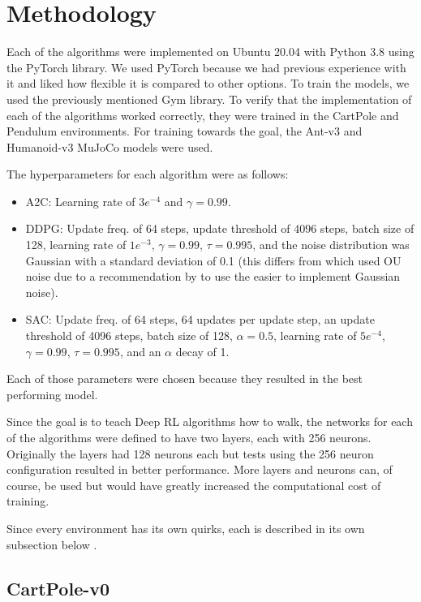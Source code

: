 \documentclass[conference]{IEEEtran}
\begin{document}
\section{Methodology}

Each of the algorithms were implemented on Ubuntu 20.04 with Python 3.8 using the PyTorch library. We used PyTorch because we had previous experience with it and liked how flexible it is compared to other options. To train the models, we used the previously mentioned Gym library. To verify that the implementation of each of the algorithms worked correctly, they were trained in the CartPole and Pendulum environments. For training towards the goal, the Ant-v3 and Humanoid-v3 MuJoCo models were used.

The hyperparameters for each algorithm were as follows:
\begin{itemize}
    \item A2C: Learning rate of $3e^{-4}$ and $\gamma = 0.99$.
    \item DDPG: Update freq. of 64 steps, update threshold of 4096 steps, batch size of 128, learning rate of $1e^{-3}$, $\gamma = 0.99$, $\tau = 0.995$, and the noise distribution was Gaussian with a standard deviation of 0.1 (this differs from \cite{DDPG} which used OU noise due to a recommendation by \cite{spinning_up_ddpg} to use the easier to implement Gaussian noise).
    \item SAC: Update freq. of 64 steps, 64 updates per update step, an update threshold of 4096 steps, batch size of 128, $\alpha = 0.5$, learning rate of $5e^{-4}$, $\gamma = 0.99$, $\tau = 0.995$, and an $\alpha$ decay of 1.
\end{itemize}
Each of those parameters were chosen because they resulted in the best performing model.

Since the goal is to teach Deep RL algorithms how to walk, the networks for each of the algorithms were defined to have two layers, each with 256 neurons. Originally the layers had 128 neurons each but tests using the 256 neuron configuration resulted in better performance. More layers and neurons can, of course, be used but would have greatly increased the computational cost of training.

Since every environment has its own quirks, each is described in its own subsection below \cite {gym_source}.

\subsection{CartPole-v0}
\end{document}
